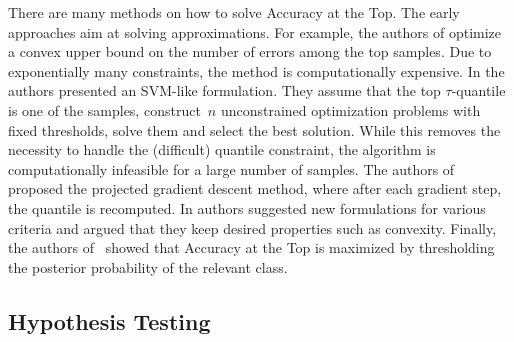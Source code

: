There are many methods on how to solve Accuracy at the Top. The early approaches aim at solving approximations. For example, the authors of \cite{joachims2005svm} optimize a convex upper bound on the number of errors among the top samples. Due to exponentially many constraints, the method is computationally expensive. In \cite{boyd2012accuracy} the authors presented an SVM-like formulation. They assume that the top $\tau$-quantile is one of the samples, construct~$n$ unconstrained optimization problems with fixed thresholds, solve them and select the best solution. While this removes the necessity to handle the (difficult) quantile constraint, the algorithm is computationally infeasible for a large number of samples. The authors of~\cite{grill2016learning} proposed the projected gradient descent method, where after each gradient step, the quantile is recomputed. In \cite{eban2017scalable} authors suggested new formulations for various criteria and argued that they keep desired properties such as convexity. Finally, the authors of~\cite{tasche2018plug} showed that Accuracy at the Top is maximized by thresholding the posterior probability of the relevant class.

\subsection{Hypothesis Testing}

